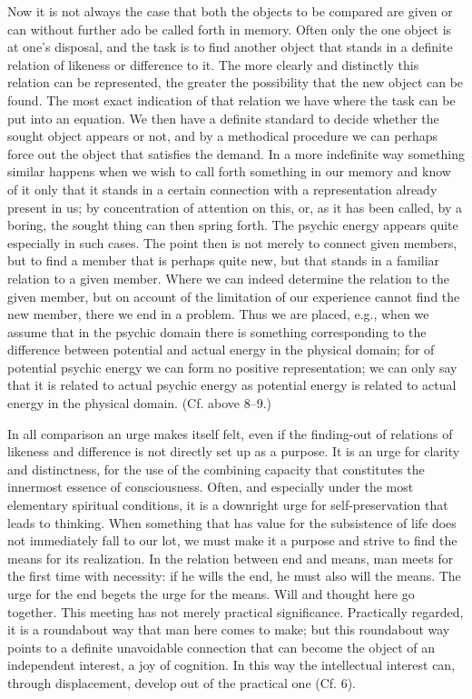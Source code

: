 \documentclass[12pt,a4paper]{book}
\newcommand{\opage}[1]{\marginnote{\footnotesize\textit{[#1]}}}
\begin{document}
Now it is not always the case that both the objects to be compared are
given or can without further ado be called forth in memory. Often only the
one object is at one's disposal, and the task is to find another object
that stands in a definite relation of likeness or difference to it. The
more clearly and distinctly this relation can be represented, the greater
the possibility that the new object can be found. The most exact
indication of that relation we have where the task can be put into an
equation. We then have a definite standard to decide whether the sought
object appears or not, and by a methodical procedure we can perhaps force
out the object that satisfies the demand. In a more indefinite way
something similar happens when we wish to call forth something in our
memory and know of it only that it stands in a certain connection with a
representation already present in us; by concentration of attention on
this, or, as it has been called, by a boring, the sought thing can then
spring forth. The psychic energy appears quite especially in such cases.
The point then is not merely to connect given members, but to find a
member that is perhaps quite new, but that stands in a familiar relation to
a given member. Where we can indeed determine the relation to the given
member, but on account of the limitation of our experience cannot find the
new member, there we end in a problem. Thus we are placed, e.g., when we
assume that in the psychic domain there is something corresponding to the
difference between potential and actual energy in the physical domain; for
of potential psychic energy we can form no positive representation; we can
only say that it is related to actual psychic energy as potential energy is
related to actual energy in the physical domain. (Cf. above 8--9.)

In all comparison an urge makes itself felt, even if the finding-out of
relations of likeness and difference is not directly set up as a purpose.
It is an urge for clarity and distinctness, for the use of the combining
capacity that \opage{67}constitutes the innermost essence of consciousness. Often,
and especially under the most elementary spiritual conditions, it is a
downright urge for self-preservation that leads to thinking. When
something that has value for the subsistence of life does not immediately
fall to our lot, we must make it a purpose and strive to find the means for
its realization. In the relation between end and means, man meets for the
first time with necessity: if he wills the end, he must also will the
means. The urge for the end begets the urge for the means. Will and thought
here go together. This meeting has not merely practical significance.
Practically regarded, it is a roundabout way that man here comes to make;
but this roundabout way points to a definite unavoidable connection that
can become the object of an independent interest, a joy of cognition. In
this way the intellectual interest can, through displacement, develop out
of the practical one (Cf. 6).
\end{document}
